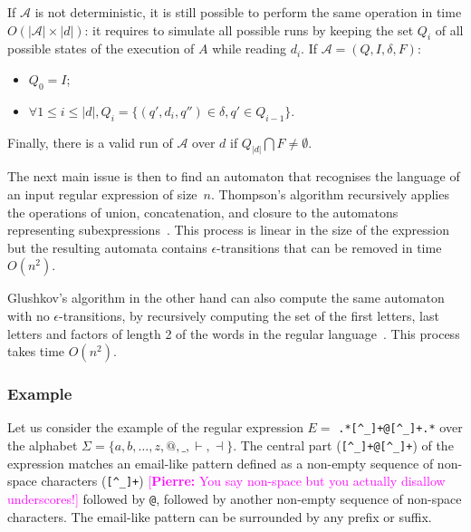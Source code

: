 \documentclass[12px]{article}
\theoremstyle{definition}
\newcommand{\pierre}[1]{\textcolor{magenta}{[\textbf{Pierre:} #1]}}
\begin{document}
        If $\mathcal{A}$ is not deterministic, it is still possible to perform
        the same operation in time $O(|\mathcal{A}|\times |d|)$: it requires to
        simulate all possible runs by keeping the set $Q_i$ of all possible
        states of the execution of $A$ while reading $d_i$. If $\mathcal{A} =
        (Q, I, \delta, F)$:
        \begin{itemize}
          \item $Q_0 = I$;
          \item $\forall 1 \leq i \leq |d|, Q_i = \{(q', d_i, q'') \in \delta,
            q' \in Q_{i-1}\}$.
        \end{itemize}
        Finally, there is a valid run of $\mathcal{A}$ over $d$ if $Q_{|d|}
        \bigcap F \neq \emptyset$.

        \vspace{0.5cm}

        The next main issue is then to find an automaton that recognises the
        language of an input regular expression of size~$n$. Thompson's algorithm
        recursively applies the operations of union,
        concatenation, and closure to the automatons representing
        subexpressions~\cite{thompson1968programming}. This process is linear
        in the size of the expression but the resulting automata contains
        $\epsilon$-transitions that can be removed in time $O(n^2)$.

        Glushkov's algorithm in the other hand can also compute the same
        automaton with no $\epsilon$-transitions, by recursively computing the
        set of the first letters, last letters and factors of length 2 of the words in
        the regular language~\cite{glushkov1961abstract}. This process takes
        time $O(n^2)$.

      \subsubsection{Example}%

        \label{sec:example_simple}

        Let us consider the example of the regular expression $E =$
        \texttt{.*[\textasciicircum\_]+@[\textasciicircum\_]+.*} over the
        alphabet $\Sigma = \{a, b, \ldots, z, @, \texttt \_, \vdash, \dashv\}$.
        The central part (\texttt{[\textasciicircum\_]+@[\textasciicircum\_]+})
        of the expression matches an email-like pattern defined as a non-empty
        sequence of non-space characters (\texttt{[\textasciicircum\_]+})
        \pierre{You say non-space but you actually disallow underscores!}
        followed by \texttt{@}, followed by another non-empty sequence of
        non-space characters. The email-like pattern can be surrounded by any
        prefix or suffix.
\end{document}
